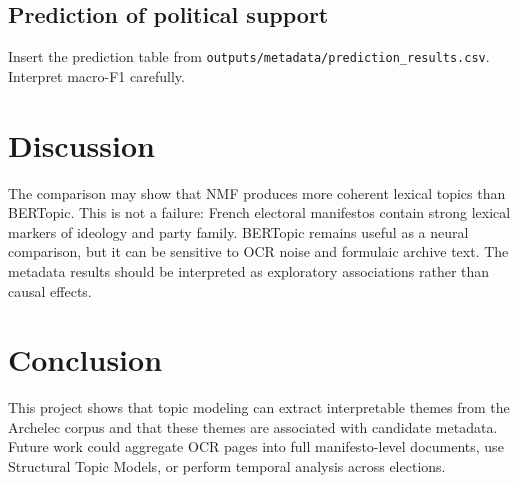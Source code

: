 \documentclass{article}
\begin{document}
\subsection{Prediction of political support}
Insert the prediction table from \texttt{outputs/metadata/prediction\_results.csv}. Interpret macro-F1 carefully.

\section{Discussion}
The comparison may show that NMF produces more coherent lexical topics than BERTopic. This is not a failure: French electoral manifestos contain strong lexical markers of ideology and party family. BERTopic remains useful as a neural comparison, but it can be sensitive to OCR noise and formulaic archive text. The metadata results should be interpreted as exploratory associations rather than causal effects.

\section{Conclusion}
This project shows that topic modeling can extract interpretable themes from the Archelec corpus and that these themes are associated with candidate metadata. Future work could aggregate OCR pages into full manifesto-level documents, use Structural Topic Models, or perform temporal analysis across elections.



\end{document}
